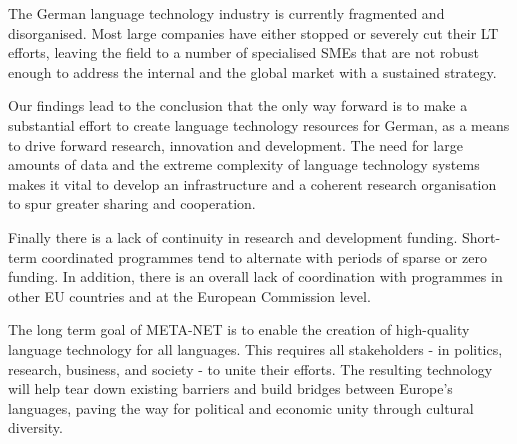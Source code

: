 \documentclass[]{../../metanetpaper}
\begin{document}
\begin{multicols}{2}
The German language technology industry is currently fragmented and disorganised. Most large companies have either stopped or severely cut their LT efforts, leaving the field to a number of specialised SMEs that are not robust enough to address the internal and the global market with a sustained strategy. 

Our findings lead to the conclusion that the only way forward is to make a substantial effort to create language technology resources for German, as a means to drive forward research, innovation and development. The need for large amounts of data and the extreme complexity of language technology systems makes it vital to develop an infrastructure and a coherent research organisation to spur greater sharing and cooperation.

Finally there is a lack of continuity in research and development funding. Short-term coordinated programmes tend to alternate with periods of sparse or zero funding. In addition, there is an overall lack of coordination with programmes in other EU countries and at the European Commission level.

The long term goal of META-NET is to enable the creation of high-quality language technology for all languages. This requires all stakeholders - in politics, research, business, and society - to unite their efforts. The resulting technology will help tear down existing barriers and build bridges between Europe’s languages, paving the way for political and economic unity through cultural diversity. 
\end{multicols}

\clearpage

\end{document}
